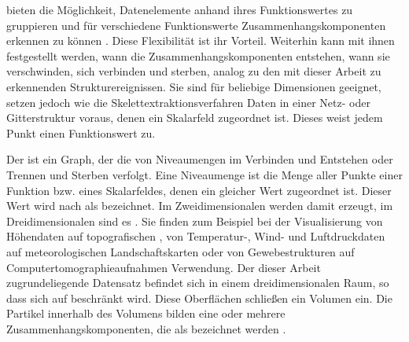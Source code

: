  bieten die Möglichkeit, Datenelemente anhand ihres Funktionswertes zu gruppieren und für verschiedene Funktionswerte Zusammenhangskomponenten erkennen zu können \cite{vanKreveld1997isosurfaceTraversal} \cite{bajaj1997contourSpectrum}. Diese Flexibilität ist ihr Vorteil. Weiterhin kann mit ihnen festgestellt werden, wann die Zusammenhangskomponenten entstehen, wann sie verschwinden, sich verbinden und sterben, analog zu den mit dieser Arbeit zu erkennenden Strukturereignissen.
Sie sind für beliebige Dimensionen geeignet, setzen jedoch wie die Skelettextraktionsverfahren Daten in einer Netz- oder Gitterstruktur voraus, denen ein Skalarfeld zugeordnet ist. Dieses weist jedem Punkt einen Funktionswert zu.

Der  ist ein Graph, der die  von Niveaumengen im Verbinden und Entstehen oder Trennen und Sterben verfolgt. Eine Niveaumenge ist die Menge aller Punkte einer Funktion bzw. eines Skalarfeldes, denen ein gleicher Wert zugeordnet ist. Dieser Wert wird nach \cite[S.~1]{carr2010flexibleIsosurfaces} als  bezeichnet. Im Zweidimensionalen werden damit  erzeugt, im Dreidimensionalen sind es . Sie finden zum Beispiel bei der Visualisierung von Höhendaten auf topografischen \cite{hurni2010landform} \cite{openstreetmapContours}, von Temperatur-, Wind- und Luftdruckdaten auf meteorologischen Landschaftskarten \cite{hopkins1996weather} oder von Gewebestrukturen auf Computertomographieaufnahmen \cite{tang2014ctImages} Verwendung.
Der dieser Arbeit zugrundeliegende Datensatz befindet sich in einem dreidimensionalen Raum, so dass sich auf  beschränkt wird. Diese Oberflächen schließen ein Volumen ein. Die Partikel innerhalb des Volumens bilden eine oder mehrere Zusammenhangskomponenten, die als  bezeichnet werden \cite[S.~2]{carr2001computingCountourTrees}.

